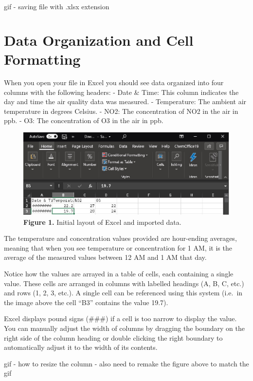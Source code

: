 \documentclass[
]{book}
\begin{document}
gif - saving file with .xlsx extension

\hypertarget{data-organization-and-cell-formatting}{%
\section{Data Organization and Cell Formatting}\label{data-organization-and-cell-formatting}}

When you open your file in Excel you should see data organized into four columns with the following headers:
- Date \& Time: This column indicates the day and time the air quality data was measured.
- Temperature: The ambient air temperature in degrees Celsius.
- NO2: The concentration of NO2 in the air in ppb.
- O3: The concentration of O3 in the air in ppb.

\begin{figure}
\centering
\includegraphics{images/Figure1.jpg}
\caption{\textbf{Figure 1.} Initial layout of Excel and imported data.}
\end{figure}

The temperature and concentration values provided are hour-ending averages, meaning that when you see temperature or concentration for 1 AM, it is the average of the measured values between 12 AM and 1 AM that day.

Notice how the values are arrayed in a table of cells, each containing a single value. These cells are arranged in columns with labelled headings (A, B, C, etc.) and rows (1, 2, 3, etc.). A single cell can be referenced using this system (i.e.~in the image above the cell ``B3'' contains the value 19.7).

Excel displays pound signs (\#\#\#) if a cell is too narrow to display the value. You can manually adjust the width of columns by dragging the boundary on the right side of the column heading or double clicking the right boundary to automatically adjust it to the width of its contents.

gif - how to resize the column - also need to remake the figure above to match the gif
\end{document}
